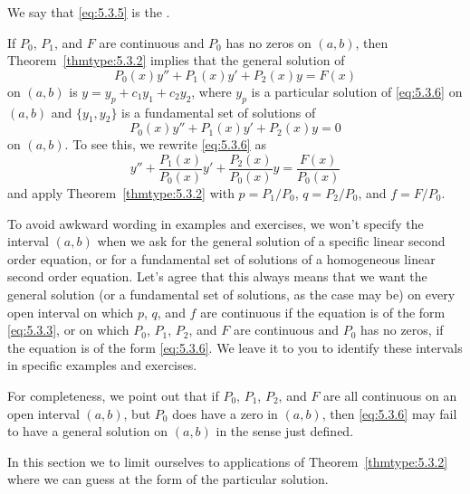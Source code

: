 \documentclass{ximera}
\begin{document}
We say that \eqref{eq:5.3.5} is the .
 
 
If $P_0$, $P_1$, and $F$ are continuous and $P_0$ has no zeros on
$(a,b)$, then  Theorem~\ref{thmtype:5.3.2} implies that the general
solution of
\begin{equation} \label{eq:5.3.6}
P_0(x)y''+P_1(x)y'+P_2(x)y=F(x)
\end{equation}
on  $(a,b)$ is $y=y_p+c_1y_1+c_2y_2$, where $y_p$ is a particular
solution  of \eqref{eq:5.3.6} on $(a,b)$ and  $\{y_1,y_2\}$ is a
fundamental set of solutions of
$$
P_0(x)y''+P_1(x)y'+P_2(x)y=0
$$
on $(a,b)$. To see this, we rewrite \eqref{eq:5.3.6} as
$$
y''+\frac{P_1(x)}{P_0(x)}y'+\frac{P_2(x)}{P_0(x)}y=\frac{F(x)}{P_0(x)}
$$
and apply Theorem~\ref{thmtype:5.3.2} with $p=P_1/P_0$, $q=P_2/P_0$, and
$f=F/P_0$.
 
 
To avoid awkward wording in examples and exercises, we won't specify
the interval $(a,b)$ when we ask for the general solution of a
specific linear second order equation, or for a fundamental set of
solutions of a homogeneous linear second order equation. Let's agree
that this always means that we want the general solution (or a
fundamental set of solutions, as the case may be) on every open
interval on which $p$, $q$, and $f$ are continuous if the equation is
of the form \eqref{eq:5.3.3}, or on which $P_0$, $P_1$, $P_2$, and $F$ are
continuous and $P_0$ has no zeros, if the equation is of the form
\eqref{eq:5.3.6}. We leave it to you to identify these intervals in
specific examples and exercises.
 
For completeness, we point out that if $P_0$, $P_1$, $P_2$, and $F$ are
all continuous on an open interval $(a,b)$, but $P_0$  does
have a zero in $(a,b)$, then \eqref{eq:5.3.6} may fail to have a general
solution on $(a,b)$ in the sense just defined.
 
In this section we to limit ourselves to applications of
Theorem~\ref{thmtype:5.3.2} where we can guess at the form of the
particular solution.
 
\end{document}
